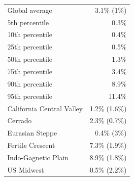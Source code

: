 
\begin{tabular}{lr}
\toprule
Global average & 3.1\% (1\%)\\
5th percentile & 0.3\%\\
10th percentile & 0.4\%\\
25th percentile & 0.5\%\\
50th percentile & 1.3\%\\
\addlinespace
75th percentile & 3.4\%\\
90th percentile & 8.9\%\\
95th percentile & 11.4\%\\
California Central Valley & 1.2\% (1.6\%)\\
Cerrado & 2.3\% (0.7\%)\\
\addlinespace
Eurasian Steppe & 0.4\% (3\%)\\
Fertile Crescent & 7.3\% (1.9\%)\\
Indo-Gagnetic Plain & 8.9\% (1.8\%)\\
US Midwest & 0.5\% (2.2\%)\\
\bottomrule
\end{tabular}
